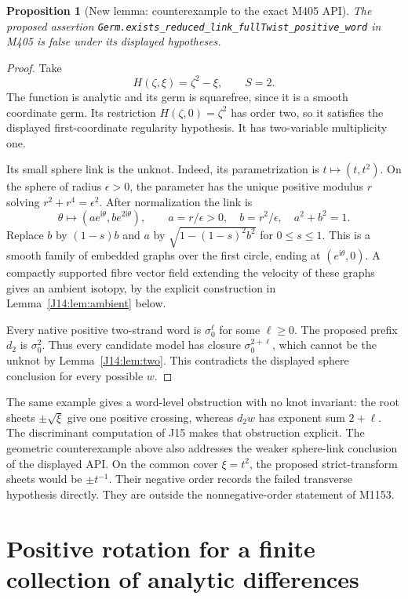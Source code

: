 \documentclass[11pt,oneside]{report}
\newtheorem{proposition}[theorem]{Proposition}
\theoremstyle{definition}
\numberwithin{equation}{section}
\newcommand{\decl}[1]{\textnormal{\nolinkurl{#1}}}
\newcommand{\ii}{\mathrm i}
\begin{document}
\begin{proposition}[New lemma: counterexample to the exact M405 API]
\label{J14:prop:false}
The proposed assertion
\decl{Germ.exists_reduced_link_fullTwist_positive_word}
in M405 is false under its displayed hypotheses.
\end{proposition}
\begin{proof}
Take
\[
 H(\zeta,\xi)=\zeta^2-\xi,\qquad S=2.
\]
The function is analytic and its germ is squarefree, since it is a smooth
coordinate germ. Its restriction $H(\zeta,0)=\zeta^2$ has order two, so it
satisfies the displayed first-coordinate regularity hypothesis. It has
two-variable multiplicity one.

Its small sphere link is the unknot. Indeed, its parametrization is
$t\mapsto(t,t^2)$. On the sphere of radius $\epsilon>0$, the parameter has
the unique positive modulus $r$ solving $r^2+r^4=\epsilon^2$. After
normalization the link is
\[
 \theta\longmapsto(ae^{\ii\theta},be^{2\ii\theta}),
 \qquad a=r/\epsilon>0,\quad b=r^2/\epsilon,
 \quad a^2+b^2=1.
\]
Replace $b$ by $(1-s)b$ and $a$ by
$\sqrt{1-(1-s)^2b^2}$ for $0\leq s\leq1$.
This is a smooth family of embedded graphs over the first circle, ending
at $(e^{\ii\theta},0)$. A compactly supported fibre vector field extending
the velocity of these graphs gives an ambient isotopy, by the explicit
construction in Lemma~\ref{J14:lem:ambient} below.

Every native positive two-strand word is $\sigma_0^\ell$ for some
$\ell\geq0$. The proposed prefix $d_2$ is $\sigma_0^2$.
Thus every candidate model has closure $\sigma_0^{2+\ell}$, which cannot be
the unknot by Lemma~\ref{J14:lem:two}. This contradicts the displayed sphere
conclusion for every possible $w$.
\end{proof}

The same example gives a word-level obstruction with no knot invariant:
the root sheets $\pm\sqrt\xi$ give one positive crossing, whereas $d_2w$
has exponent sum $2+\ell$. The discriminant computation of J15 makes that
obstruction explicit. The geometric counterexample above also addresses
the weaker sphere-link conclusion of the displayed API.
On the common cover $\xi=t^2$, the proposed strict-transform sheets would
be $\pm t^{-1}$. Their negative order records the failed transverse
hypothesis directly. They are outside the nonnegative-order statement of
M1153.

\section{Positive rotation for a finite collection of analytic differences}
\end{document}
